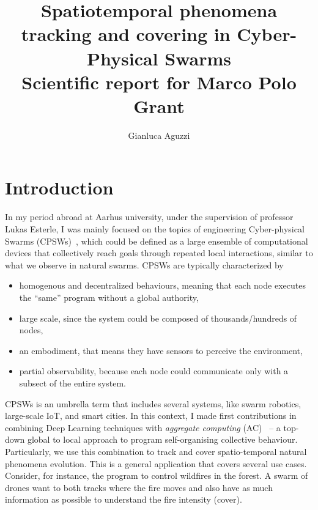 \documentclass{article}
\title{
Spatiotemporal phenomena tracking and covering in Cyber-Physical Swarms \\[10pt]
\large Scientific report for Marco Polo Grant
}
\author{Gianluca Aguzzi
}
\begin{document}
\maketitle

\begin{abstract}

\end{abstract}

\section{Introduction}
In my period abroad at Aarhus university, under the supervision of professor Lukas Esterle, 
 I was mainly focused on the topics of engineering Cyber-physical Swarms (CPSWs)~\cite{aguzzi2021research}, which could be defined as a
 large ensemble of computational devices that collectively reach goals through repeated local interactions, similar to what we observe in natural swarms. 
CPSWs are typically characterized by 
\begin{itemize}
\item homogenous and decentralized behaviours, meaning that each node executes the ``same'' program without a global authority,
\item large scale, since the system could be composed of thousands/hundreds of nodes, 
\item an embodiment, that means they have sensors to perceive the environment,
\item partial observability, because each node could communicate only with a subsect of the entire system.
\end{itemize}
CPSWs is an umbrella term that includes several systems, 
like swarm robotics, large-scale IoT, and smart cities.
%
In this context, I made first contributions in combining Deep Learning techniques with \textit{aggregate computing} (AC)~\cite{beal2015aggregate}
 -- a top-down global to local approach to program self-organising collective behaviour.
Particularly, we use this combination to track and cover spatio-temporal natural phenomena evolution. 
%
This is a general application that covers several use cases. 
 Consider, for instance, the program to control wildfires in the forest. 
 A swarm of drones want to both tracks where the fire moves and also have as much information as possible to understand the fire intensity (cover).
%
 
\end{document}
